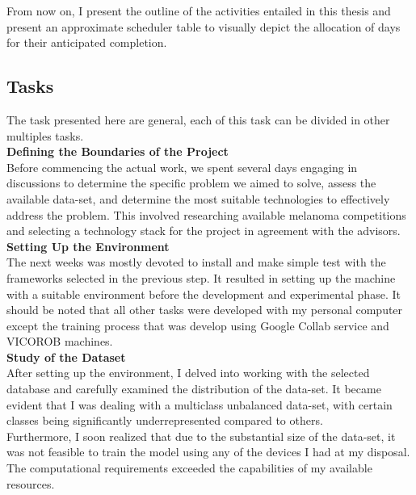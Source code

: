 From now on, I present the outline of the activities entailed in this thesis and present an approximate scheduler table to visually depict the allocation of days for their anticipated completion.

\subsection{Tasks}

The task presented here are general, each of this task can be divided in other multiples tasks. \\

\vspace{0.5cm}
\textbf{Defining the Boundaries of the Project} \\

Before commencing the actual work, we spent several days engaging in discussions to determine the specific problem we aimed to solve, assess the available data-set, and determine the most suitable technologies to effectively address the problem. This involved researching available melanoma competitions and selecting a technology stack for the project in agreement with the advisors. \\

\vspace{0.5cm}
\textbf{Setting Up the Environment} \\

The next weeks was mostly devoted to install and make simple test with the frameworks selected
in the previous step. It resulted in setting up the machine with a suitable environment
before the development and experimental phase. It should be noted that all other tasks were developed with my personal computer except the training process that was develop using Google Collab service and VICOROB machines. \\

\vspace{0.5cm}
\textbf{Study of the Dataset} \\

After setting up the environment, I delved into working with the selected database and carefully examined the distribution of the data-set. It became evident that I was dealing with a multiclass unbalanced data-set, with certain classes being significantly underrepresented compared to others. \\

Furthermore, I soon realized that due to the substantial size of the data-set, it was not feasible to train the model using any of the devices I had at my disposal. The computational requirements exceeded the capabilities of my available resources. \\

